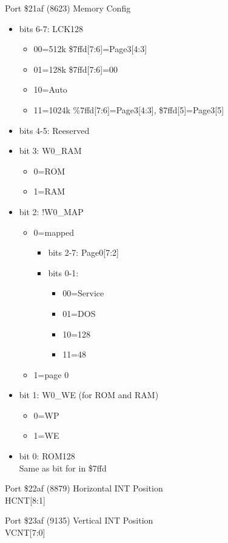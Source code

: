 Port \$21af (8623) Memory Config
\begin{itemize}
\item[] bits 6-7: LCK128
  \begin{itemize}
  \item[] 00=512k \$7ffd[7:6]=Page3[4:3]
  \item[] 01=128k \$7ffd[7:6]=00
  \item[] 10=Auto
  \item[] 11=1024k \%7ffd[7:6]=Page3[4:3], \$7ffd[5]=Page3[5]
  \end{itemize}
\item[] bits 4-5: Reeserved
\item[] bit 3: W0\_RAM
  \begin{itemize}
  \item[] 0=ROM
  \item[] 1=RAM
  \end{itemize}
\item[] bit 2: !W0\_MAP
  \begin{itemize}
  \item[] 0=mapped
    \begin{itemize}
      \item[] bits 2-7: Page0[7:2]
      \item[] bits 0-1:
        \begin{itemize}
        \item[] 00=Service
        \item[] 01=DOS
        \item[] 10=128
        \item[] 11=48
        \end{itemize}
    \end{itemize}
  \item[] 1=page 0
  \end{itemize}
\item[] bit 1: W0\_WE (for ROM and RAM)
  \begin{itemize}
  \item[] 0=WP
  \item[] 1=WE 
  \end{itemize}
\item[] bit 0: ROM128\\
  Same as bit for in \$7ffd
\end{itemize}

Port \$22af (8879) Horizontal INT Position\\
HCNT[8:1]

Port \$23af (9135) Vertical INT Position\\
VCNT[7:0]

